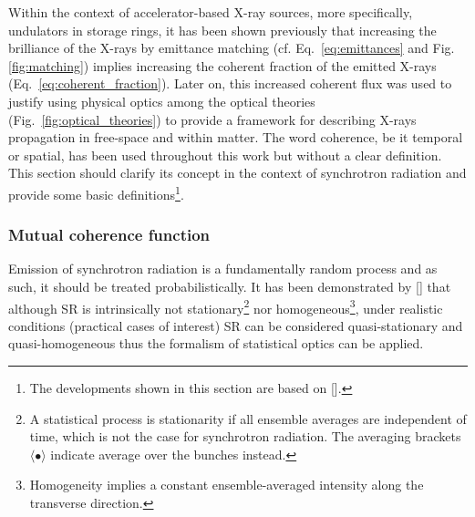 \begin{refsection}
Within the context of accelerator-based X-ray sources, more specifically, undulators in storage rings, it has been shown previously that increasing the brilliance of the X-rays by emittance matching (cf. Eq.~\ref{eq:emittances} and Fig.\ref{fig:matching}) implies increasing the coherent fraction of the emitted X-rays (Eq.~\ref{eq:coherent_fraction}). Later on, this increased coherent flux was used to justify using physical optics among the optical theories (Fig.~\ref{fig:optical_theories}) to provide a framework for describing X-rays propagation in free-space and within matter. The word coherence, be it temporal or spatial, has been used throughout this work but without a clear definition. This section should clarify its concept in the context of synchrotron radiation and provide some basic definitions\footnote{The developments shown in this section are based on [\cite[\textit{§4}]{Mandel1995}].}.

\subsubsection*{Mutual coherence function}

Emission of synchrotron radiation is a fundamentally random process and as such, it should be treated probabilistically. It has been demonstrated by [\cite{Geloni2008}] that although SR is intrinsically not stationary\footnote{A statistical process is stationarity if all ensemble averages are independent of time, which is not the case for synchrotron radiation. The averaging brackets $\langle \bullet \rangle$ indicate average over the bunches instead.} nor homogeneous\footnote{Homogeneity implies a constant ensemble-averaged intensity along the transverse direction.}, under realistic conditions (practical cases of interest) SR can be considered quasi-stationary and quasi-homogeneous thus the formalism of statistical optics can be applied.


\end{refsection}
